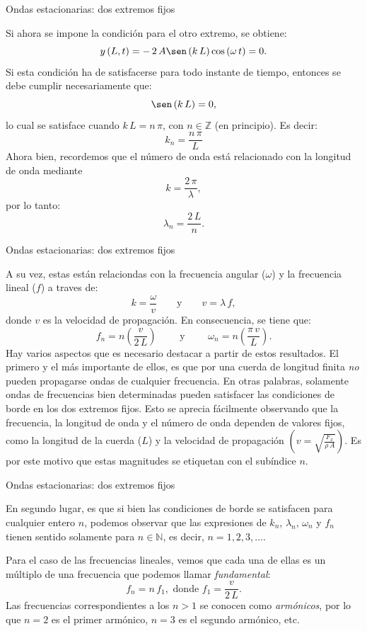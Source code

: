 \documentclass[11pt,handout,aspectratio=1610]{beamer}
\newcommand{\zz}{\mathbb{Z}}
\newcommand{\nn}{\mathbb{N}}
\newcommand{\vs}{\vspace{11pt}}
\begin{document}
\begin{frame}{Ondas estacionarias: dos extremos fijos}   
    
    Si ahora se impone la condición para el otro extremo, se obtiene: $$ y \left(L,t\right) = - \, 2 \, A \sen \left(k \, L\right) \cos \left(\omega \, t\right) = 0. $$ Si esta condición ha de satisfacerse para todo instante de tiempo, entonces se debe cumplir necesariamente que: $$ \sen \left(k \, L\right) = 0, $$ lo cual se satisface cuando $ k \, L = n \, \pi $, con $ n \in \zz $ (en principio). Es decir: $$ k_n = \frac{n \, \pi}{L} $$  Ahora bien, recordemos que el número de onda está relacionado con la longitud de onda mediante $$ k = \frac{2 \, \pi}{\lambda}, $$ por lo tanto: $$ \lambda_n = \frac{2 \, L}{n}. $$
    
\end{frame}

\begin{frame}{Ondas estacionarias: dos extremos fijos}

   A su vez, estas están relaciondas con la frecuencia angular ($\omega$) y la frecuencia lineal ($f$) a traves de: $$ k = \frac{\omega}{v} \qquad \text{y} \qquad v = \lambda \, f, $$ donde $v$ es la velocidad de propagación. En consecuencia, se tiene que: $$ f_n = n \left(\frac{v}{2 \, L}\right) \qquad \text{ y } \qquad \omega_n = n \left(\frac{\pi \, v}{L}\right). $$ Hay varios aspectos que es necesario destacar a partir de estos resultados. El primero y el más importante de ellos, es que por una cuerda de longitud finita \emph{no} pueden propagarse ondas de cualquier frecuencia. En otras palabras, solamente ondas de frecuencias bien determinadas pueden satisfacer las condiciones de borde en los dos extremos fijos. Esto se aprecia fácilmente observando que la frecuencia, la longitud de onda y el número de onda dependen de valores fijos, como la longitud de la cuerda ($L$) y la velocidad de propagación $\left(v = \sqrt{\frac{F_x}{\rho \, A}}\right)$. Es por este motivo que estas magnitudes se etiquetan con el subíndice $n$.
    
\end{frame}

\begin{frame}{Ondas estacionarias: dos extremos fijos}

    En segundo lugar, es que si bien las condiciones de borde se satisfacen para cualquier entero $n$, podemos observar que las expresiones de $k_n$, $\lambda_n$, $\omega_n$ y $f_n$ tienen sentido solamente para $n \in \nn $, es decir, $n = 1, 2, 3, \ldots$.

    \vs 

    Para el caso de las frecuencias lineales, vemos que cada una de ellas es un múltiplo de una frecuencia que podemos llamar \emph{fundamental}: $$ f_n = n \, f_1, \text{ donde } f_1 = \frac{v}{2 \, L}. $$ Las frecuencias correspondientes a los $n > 1$ se conocen como \emph{armónicos}, por lo que $n=2$ es el primer armónico, $n=3$ es el segundo armónico, etc.
    
\end{frame}
\end{document}
